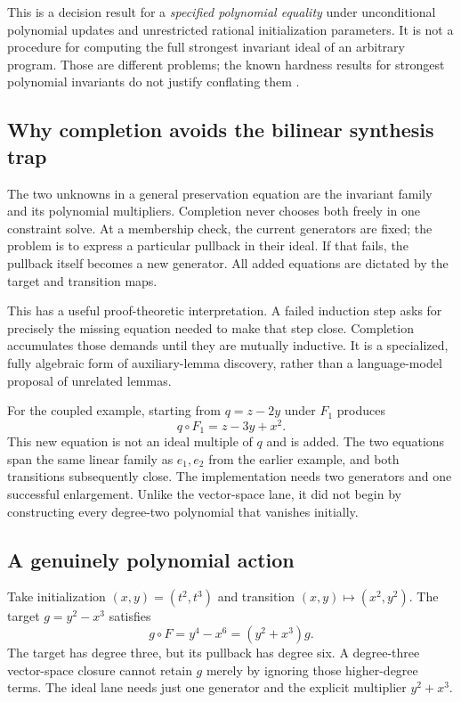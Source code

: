 This is a decision result for a \emph{specified polynomial equality} under
unconditional polynomial updates and unrestricted rational initialization
parameters. It is not a procedure for computing the full strongest invariant
ideal of an arbitrary program. Those are different problems; the known
hardness results for strongest polynomial invariants do not justify conflating
them \cite{mullner}.

\subsection{Why completion avoids the bilinear synthesis trap}

The two unknowns in a general preservation equation are the invariant family
and its polynomial multipliers. Completion never chooses both freely in one
constraint solve. At a membership check, the current generators are fixed;
the problem is to express a particular pullback in their ideal. If that fails,
the pullback itself becomes a new generator. All added equations are dictated
by the target and transition maps.

This has a useful proof-theoretic interpretation. A failed induction step asks
for precisely the missing equation needed to make that step close. Completion
accumulates those demands until they are mutually inductive. It is a specialized,
fully algebraic form of auxiliary-lemma discovery, rather than a language-model
proposal of unrelated lemmas.

For the coupled example, starting from $q=z-2y$ under $F_1$ produces
\[
 q\circ F_1=z-3y+x^2.
\]
This new equation is not an ideal multiple of $q$ and is added. The two equations
span the same linear family as $e_1,e_2$ from the earlier example, and both
transitions subsequently close. The implementation needs two generators and
one successful enlargement. Unlike the vector-space lane, it did not begin by
constructing every degree-two polynomial that vanishes initially.

\subsection{A genuinely polynomial action}

Take initialization $(x,y)=(t^2,t^3)$ and transition $(x,y)\mapsto(x^2,y^2)$.
The target $g=y^2-x^3$ satisfies
\[
 g\circ F=y^4-x^6=(y^2+x^3)g.
\]
The target has degree three, but its pullback has degree six. A degree-three
vector-space closure cannot retain $g$ merely by ignoring those higher-degree
terms. The ideal lane needs just one generator and the explicit multiplier
$y^2+x^3$.

